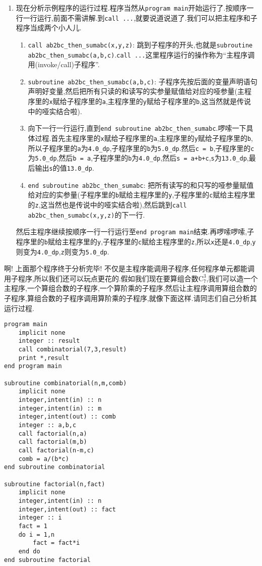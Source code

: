 \begin{enumerate}
    \item 现在分析示例程序的运行过程.程序当然从\texttt{program main}开始运行了.按顺序一行一行运行,前面不需讲解.到\texttt{call ...},就要说道说道了.我们可以把主程序和子程序当成两个小人儿.\begin{enumerate}
        \item \texttt{call ab2bc\_{}then\_{}sumabc(x,y,z)}: 跳到子程序的开头,也就是\texttt{subroutine ab2bc\_{}then\_{}sumabc(a,b,c)}.\texttt{call ...}这里程序运行的操作称为``主程序调用(invoke/call)子程序''.
        \item \texttt{subroutine ab2bc\_{}then\_{}sumabc(a,b,c)}: 子程序先按后面的变量声明语句声明好变量,然后把所有只读的和读写的实参量赋值给对应的哑参量(主程序里的\texttt{x}赋给子程序里的\texttt{a},主程序里的\texttt{y}赋给子程序里的\texttt{b},这当然就是传说中的哑实结合啦).
        \item 向下一行一行运行,直到\texttt{end subroutine ab2bc\_{}then\_{}sumabc}.啰嗦一下具体过程.首先主程序里的\texttt{x}赋给子程序里的\texttt{a},主程序里的\texttt{y}赋给子程序里的\texttt{b},所以子程序里的\texttt{a}为\texttt{4.0\_{}dp},子程序里的\texttt{b}为\texttt{5.0\_{}dp}.然后\texttt{c = b},子程序里的\texttt{c}为\texttt{5.0\_{}dp},然后\texttt{b = a},子程序里的\texttt{b}为\texttt{4.0\_{}dp},然后\texttt{s = a+b+c},\texttt{s}为\texttt{13.0\_{}dp},最后输出\texttt{s}的值\texttt{13.0\_{}dp}.
        \item \texttt{end subroutine ab2bc\_{}then\_{}sumabc}: 把所有读写的和只写的哑参量赋值给对应的实参量(子程序里的\texttt{b}赋给主程序里的\texttt{y},子程序里的\texttt{c}赋给主程序里的\texttt{z},这当然也是传说中的哑实结合啦),然后跳到\texttt{call ab2bc\_{}then\_{}sumabc(x,y,z)}的下一行.
    \end{enumerate}然后主程序继续按顺序一行一行运行至\texttt{end program main}结束.再啰嗦啰嗦,子程序里的\texttt{b}赋给主程序里的\texttt{y},子程序里的\texttt{c}赋给主程序里的\texttt{z},所以\texttt{x}还是\texttt{4.0\_{}dp},\texttt{y}则变为\texttt{4.0\_{}dp},\texttt{z}则变为\texttt{5.0\_{}dp}.
\end{enumerate}

啊! 上面那个程序终于分析完毕! 不仅是主程序能调用子程序,任何程序单元都能调用子程序,所以我们还可以玩点更花的.假如我们现在要算组合数$\text{C}_7^3$,我们可以造一个主程序,一个算组合数的子程序,一个算阶乘的子程序,然后让主程序调用算组合数的子程序,算组合数的子程序调用算阶乘的子程序,就像下面这样.请同志们自己分析其运行过程.\label{fact_comb}
\begin{lstlisting}
program main
    implicit none
    integer :: result
    call combinatorial(7,3,result)
    print *,result
end program main

subroutine combinatorial(n,m,comb)
    implicit none
    integer,intent(in) :: n
    integer,intent(in) :: m
    integer,intent(out) :: comb
    integer :: a,b,c
    call factorial(n,a)
    call factorial(m,b)
    call factorial(n-m,c)
    comb = a/(b*c)
end subroutine combinatorial

subroutine factorial(n,fact)
    implicit none
    integer,intent(in) :: n
    integer,intent(out) :: fact
    integer :: i
    fact = 1
    do i = 1,n
        fact = fact*i
    end do
end subroutine factorial
\end{lstlisting}

